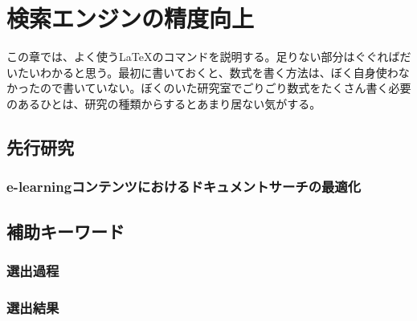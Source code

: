 \chapter{検索エンジンの精度向上}
\label{chap:search}

この章では、よく使う\LaTeX のコマンドを説明する。足りない部分はぐぐればだいたいわかると思う。最初に書いておくと、数式を書く方法は、ぼく自身使わなかったので書いていない。ぼくのいた研究室でごりごり数式をたくさん書く必要のあるひとは、研究の種類からするとあまり居ない気がする。

\section{先行研究}

\subsection{e-learningコンテンツにおけるドキュメントサーチの最適化}


\section{補助キーワード}

\subsection{選出過程}

\subsection{選出結果}


